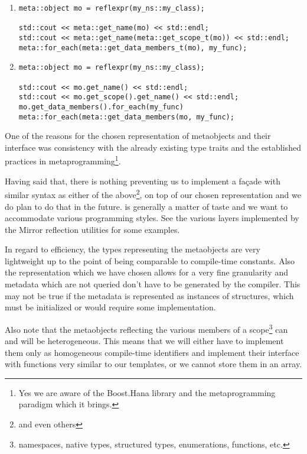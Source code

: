 \begin{enumerate}[label=\textbf{\Alph*)}]

\item
\begin{verbatim}
meta::object mo = reflexpr(my_ns::my_class);

std::cout << meta::get_name(mo) << std::endl;
std::cout << meta::get_name(meta::get_scope_t(mo)) << std::endl;
meta::for_each(meta::get_data_members_t(mo), my_func);
\end{verbatim}

\item
\begin{verbatim}
meta::object mo = reflexpr(my_ns::my_class);

std::cout << mo.get_name() << std::endl;
std::cout << mo.get_scope().get_name() << std::endl;
mo.get_data_members().for_each(my_func)
meta::for_each(meta::get_data_members(mo, my_func);
\end{verbatim}

\end{enumerate}

One of the reasons for the chosen representation of metaobjects and their
interface was consistency with the already existing type traits and the
established practices in metaprogramming\footnote{Yes we are aware of the
Boost.Hana library and the metaprogramming paradigm which it brings.}.

Having said that, there is nothing preventing us to implement a fa\c{c}ade
with similar syntax as either of the above\footnote{and even others}, on top
of our chosen representation and we do plan to do that in the future.
 is generally a matter of taste and we want to accommodate
various programming styles. See the various layers implemented by the Mirror
reflection utilities \cite{Chochlik-Mirror-doc} for some examples.

In regard to efficiency, the types representing the metaobjects are very
lightweight up to the point of being comparable to compile-time constants.
Also the representation which we have chosen allows for a very fine granularity
and metadata which are not queried don't have to be generated by the compiler.
This may not be true if the metadata is represented as instances of \verb@constexpr@
structures, which must be initialized or would require some 
implementation.

Also note that the metaobjects reflecting the various members of a scope\footnote{
namespaces, native types, structured types, enumerations, functions, etc.}
can and will be heterogeneous. This means that we will either have to implement
them only as homogeneous compile-time identifiers and implement their interface
with  \verb@constexpr@ functions very similar to our templates, or
we cannot store them in an array.

